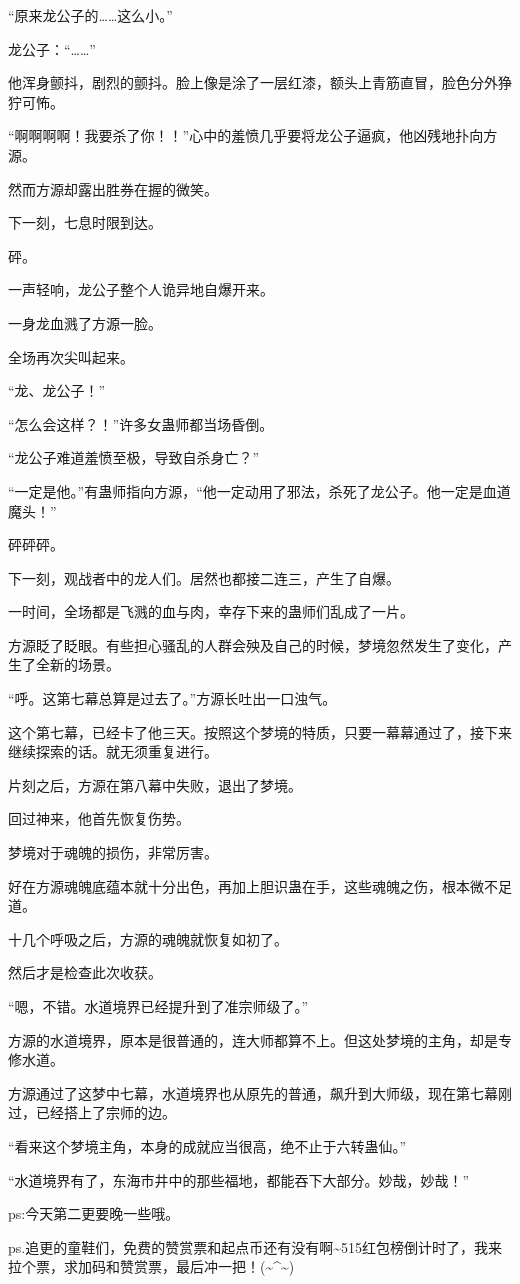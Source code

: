 \begin{this_body}
“原来龙公子的……这么小。”

龙公子：“……”

他浑身颤抖，剧烈的颤抖。脸上像是涂了一层红漆，额头上青筋直冒，脸色分外狰狞可怖。

“啊啊啊啊！我要杀了你！！”心中的羞愤几乎要将龙公子逼疯，他凶残地扑向方源。

然而方源却露出胜券在握的微笑。

下一刻，七息时限到达。

砰。

一声轻响，龙公子整个人诡异地自爆开来。

一身龙血溅了方源一脸。

全场再次尖叫起来。

“龙、龙公子！”

“怎么会这样？！”许多女蛊师都当场昏倒。

“龙公子难道羞愤至极，导致自杀身亡？”

“一定是他。”有蛊师指向方源，“他一定动用了邪法，杀死了龙公子。他一定是血道魔头！”

砰砰砰。

下一刻，观战者中的龙人们。居然也都接二连三，产生了自爆。

一时间，全场都是飞溅的血与肉，幸存下来的蛊师们乱成了一片。

方源眨了眨眼。有些担心骚乱的人群会殃及自己的时候，梦境忽然发生了变化，产生了全新的场景。

“呼。这第七幕总算是过去了。”方源长吐出一口浊气。

这个第七幕，已经卡了他三天。按照这个梦境的特质，只要一幕幕通过了，接下来继续探索的话。就无须重复进行。

片刻之后，方源在第八幕中失败，退出了梦境。

回过神来，他首先恢复伤势。

梦境对于魂魄的损伤，非常厉害。

好在方源魂魄底蕴本就十分出色，再加上胆识蛊在手，这些魂魄之伤，根本微不足道。

十几个呼吸之后，方源的魂魄就恢复如初了。

然后才是检查此次收获。

“嗯，不错。水道境界已经提升到了准宗师级了。”

方源的水道境界，原本是很普通的，连大师都算不上。但这处梦境的主角，却是专修水道。

方源通过了这梦中七幕，水道境界也从原先的普通，飙升到大师级，现在第七幕刚过，已经搭上了宗师的边。

“看来这个梦境主角，本身的成就应当很高，绝不止于六转蛊仙。”

“水道境界有了，东海市井中的那些福地，都能吞下大部分。妙哉，妙哉！”

ps:今天第二更要晚一些哦。

ps.追更的童鞋们，免费的赞赏票和起点币还有没有啊\~{}515红包榜倒计时了，我来拉个票，求加码和赞赏票，最后冲一把！(\~{}\^{}\~{})

\end{this_body}

